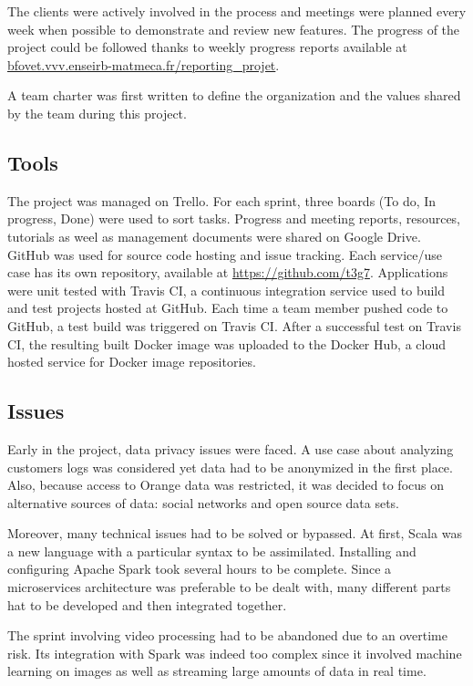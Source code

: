 \documentclass[11pt]{article}
\begin{document}
The clients were actively involved in the process and meetings were planned every week when possible to demonstrate and review new features. The progress of the project could be followed thanks to weekly progress reports available at \url{bfovet.vvv.enseirb-matmeca.fr/reporting_projet}.

A team charter was first written to define the organization and the values shared by the team during this project.

\subsection{Tools}

The project was managed on \textsf{Trello}. For each sprint, three boards (To do, In progress, Done) were used to sort tasks.
Progress and meeting reports, resources, tutorials as weel as management documents were shared on \textsf{Google Drive}.
\textsf{GitHub} was used for source code hosting and issue tracking. Each service/use case has its own repository, available at \url{https://github.com/t3g7}.
Applications were unit tested with \textsf{Travis CI}, a continuous integration service used to build and test projects hosted at \textsf{GitHub}. Each time a team member pushed code to \textsf{GitHub}, a test build was triggered on \textsf{Travis CI}.
After a successful test on \textsf{Travis CI}, the resulting built \textsf{Docker} image was uploaded to the \textsf{Docker Hub}, a cloud hosted service for \textsf{Docker} image repositories.

\subsection{Issues}

Early in the project, data privacy issues were faced. A use case about analyzing customers logs was considered yet data had to be anonymized in the first place. Also, because access to \textsf{Orange} data was restricted, it was decided to focus on alternative sources of data: social networks and open source data sets.

Moreover, many technical issues had to be solved or bypassed. At first, \textsf{Scala} was a new language with a particular syntax to be assimilated. Installing and configuring \textsf{Apache Spark} took several hours to be complete. Since a microservices architecture was preferable to be dealt with, many different parts hat to be developed and then integrated together.

The sprint involving video processing had to be abandoned due to an overtime risk. Its integration with \textsf{Spark} was indeed too complex since it involved machine learning on images as well as streaming large amounts of data in real time.
\end{document}
